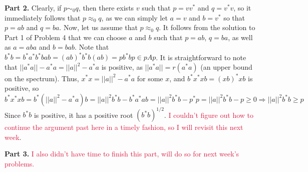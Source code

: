 \documentclass[aps,pra,showpacs,notitlepage,onecolumn,superscriptaddress,nofootinbib]{revtex4-1}
\newcommand{\pop}[1]{\textcolor{crimson}{#1}}
\theoremstyle{definition}
\begin{document}
\noindent \textbf{Part 2.} Clearly, if $p \sim_0 q$, then there exists $v$ such that $p = v v^{*}$ and $q = v^{*} v$, so it immediately follows that $p \approx_0 q$, as we can simply let $a = v$
and $b = v^{*}$ so that $p = ab$ and $q = ba$. Now, let us assume that $p \approx_0 q$. It follows from the solution to Part 1 of Problem 4 that we can choose $a$ and $b$ such that $p = ab$, $q = ba$,
as well as $a = aba$ and $b = bab$. Note that $b^{*} b = b^{*} a^{*} b^{*} b a b = (ab)^{*} b^{*} b (ab) = p b^{*} b p \in pAp$. It is straightforward to note that
$||a^{*} a|| - a^{*} a = ||a||^2 - a^{*} a$ is positive, as $||a^{*} a|| = r(a^{*} a)$ (an upper bound on the spectrum). Thus, $x^{*} x = ||a||^2 - a^{*} a$ for some $x$, and $b^{*} x^{*} x b = (xb)^{*} xb$ is positive, so
\begin{equation}
  b^{*} x^{*} x b = b^{*} (||a||^2 - a^{*} a) b = ||a||^2 b^{*} b - b^{*} a^{*} a b = ||a||^2 b^{*} b - p^{*} p = ||a||^2 b^{*} b - p \geq 0 \Rightarrow ||a||^2 b^{*} b \geq p
\end{equation}
Since $b^{*} b$ is positive, it has a positive root $(b^{*} b)^{1/2}$. \pop{I couldn't figure out how to continue the argument past here in a timely fashion, so I will revisit this next week}.
\newline

\noindent \textbf{Part 3.} \pop{I also didn't have time to finish this part, will do so for next week's problems.}
\end{document}
